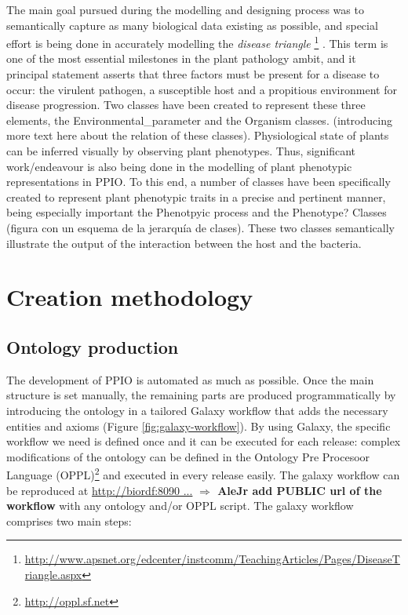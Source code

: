 \documentclass[sw]{iosart2c}
\newcommand{\myurl}[1]{\footnote{\url{#1}}}
\newcommand{\todo}[1]{\textbf{{\color{blue}$\Longrightarrow$ #1}}}
\begin{document}
The main goal pursued during the modelling and designing process was to semantically capture as many biological data existing as possible, and special effort is being done in accurately modelling the {\itshape disease triangle} \myurl{http://www.apsnet.org/edcenter/instcomm/TeachingArticles/Pages/DiseaseTriangle.aspx} . This term is one of the most essential milestones in the plant pathology ambit, and it principal statement asserts that three factors must be present for a disease to occur: the virulent pathogen, a susceptible host and a propitious environment for disease progression. Two classes have been created to represent these three elements, the {\sf Environmental\_parameter} and the {\sf Organism} classes. (introducing more text here about the relation of these classes).
Physiological state of plants can be inferred visually by observing plant phenotypes. Thus, significant work/endeavour is also being done in the modelling of plant phenotypic representations in PPIO. To this end, a number of classes have been specifically created to represent plant phenotypic traits in a precise and pertinent manner, being especially important the Phenotpyic process and the Phenotype? Classes (figura con un esquema de la jerarquía de clases). These two classes semantically illustrate the output of the interaction between the host and the bacteria. 


\section{Creation methodology}


\subsection{Ontology production}

The development of PPIO is automated as much as possible. Once the main structure is set manually, the remaining parts are produced programmatically by introducing the ontology in a tailored Galaxy \cite{galaxy} workflow that adds the necessary entities and axioms (Figure \ref{fig:galaxy-workflow}). By using Galaxy, the specific workflow we need is defined once and it can be executed for each release: complex modifications of the ontology can be defined in the Ontology Pre Procesoor Language (OPPL)\myurl{http://oppl.sf.net} and executed in every release easily. The galaxy workflow can be reproduced at \url{http://biordf:8090 ...} \todo{AleJr add PUBLIC url of the workflow} with any ontology and/or OPPL script. The galaxy workflow comprises two main steps:
\end{document}
